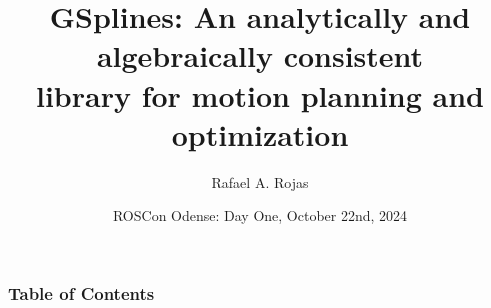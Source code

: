 \documentclass[aspectratio=169]{beamer}
\title{GSplines: An analytically and algebraically consistent \\
	library for motion planning and optimization}
\author{Rafael A. Rojas}
\date{ROSCon Odense: Day One, October 22nd, 2024}
\begin{document}
{
\begin{frame}
	\titlepage
\end{frame}
\addtocounter{framenumber}{-1}
}

\begin{frame}
	\frametitle{Table of Contents}
	\tableofcontents
\end{frame}







\begin{frame}
\end{frame}
\end{document}
